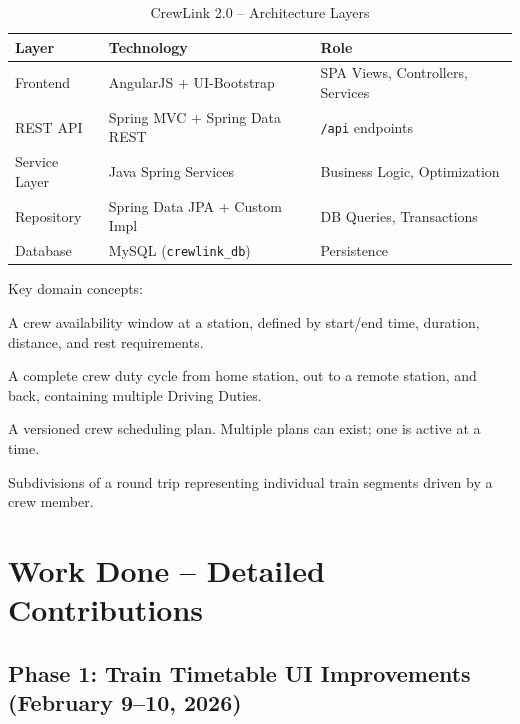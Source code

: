 \documentclass[12pt,a4paper]{article}
\begin{document}
\begin{table}[h]
\centering
\begin{tabular}{@{} L{3cm} L{5cm} L{6cm} @{}}
\toprule
\textbf{Layer} & \textbf{Technology} & \textbf{Role} \\
\midrule
Frontend        & AngularJS + UI-Bootstrap          & SPA Views, Controllers, Services \\
REST API        & Spring MVC + Spring Data REST     & \texttt{/api} endpoints \\
Service Layer   & Java Spring Services              & Business Logic, Optimization \\
Repository      & Spring Data JPA + Custom Impl     & DB Queries, Transactions \\
Database        & MySQL (\texttt{crewlink\_db})     & Persistence \\
\bottomrule
\end{tabular}
\caption{CrewLink 2.0 -- Architecture Layers}
\end{table}

Key domain concepts:
\begin{description}[leftmargin=1.5em]
    \item[\textbf{CrewLink}] A crew availability window at a station, defined
          by start/end time, duration, distance, and rest requirements.
    \item[\textbf{RoundTrip}] A complete crew duty cycle from home station, out
          to a remote station, and back, containing multiple Driving Duties.
    \item[\textbf{UserPlan}] A versioned crew scheduling plan. Multiple plans
          can exist; one is active at a time.
    \item[\textbf{DrivingDuty / DrivingSection}] Subdivisions of a round trip
          representing individual train segments driven by a crew member.
\end{description}

\section{Work Done -- Detailed Contributions}

\subsection{Phase 1: Train Timetable UI Improvements (February 9--10, 2026)}
\end{document}
